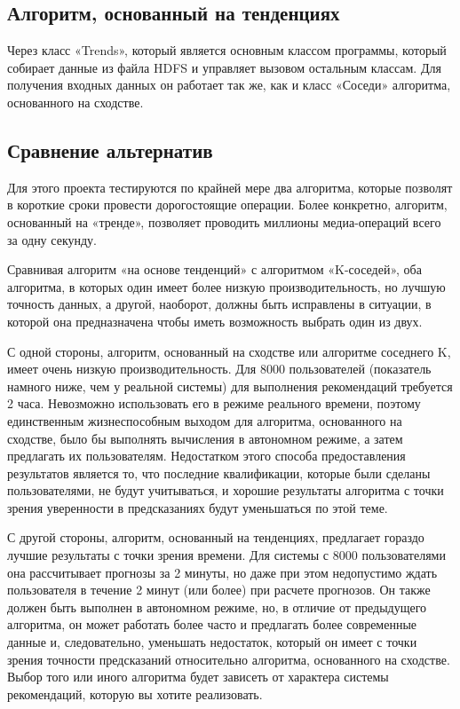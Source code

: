 \subsection{Алгоритм, основанный на тенденциях}

Через класс «Trends», который является основным классом программы, который собирает данные из файла HDFS и управляет вызовом остальным классам. Для получения входных данных он работает так же, как и класс «Соседи» алгоритма, основанного на сходстве.

\subsection{Сравнение альтернатив}

Для этого проекта тестируются по крайней мере два алгоритма, которые позволят в короткие сроки провести дорогостоящие операции. Более конкретно, алгоритм, основанный на «тренде», позволяет проводить миллионы медиа-операций всего за одну секунду.

Сравнивая алгоритм «на основе тенденций» с алгоритмом «K-соседей», оба алгоритма, в которых один имеет более низкую производительность, но лучшую точность данных, а другой, наоборот, должны быть исправлены в ситуации, в которой она предназначена чтобы иметь возможность выбрать один из двух.

С одной стороны, алгоритм, основанный на сходстве или алгоритме соседнего K, имеет очень низкую производительность. Для 8000 пользователей (показатель намного ниже, чем у реальной системы) для выполнения рекомендаций требуется 2 часа. Невозможно использовать его в режиме реального времени, поэтому единственным жизнеспособным выходом для алгоритма, основанного на сходстве, было бы выполнять вычисления в автономном режиме, а затем предлагать их пользователям. Недостатком этого способа предоставления результатов является то, что последние квалификации, которые были сделаны пользователями, не будут учитываться, и хорошие результаты алгоритма с точки зрения уверенности в предсказаниях будут уменьшаться по этой теме.

С другой стороны, алгоритм, основанный на тенденциях, предлагает гораздо лучшие результаты с точки зрения времени. Для системы с 8000 пользователями она рассчитывает прогнозы за 2 минуты, но даже при этом недопустимо ждать пользователя в течение 2 минут (или более) при расчете прогнозов. Он также должен быть выполнен в автономном режиме, но, в отличие от предыдущего алгоритма, он может работать более часто и предлагать более современные данные и, следовательно, уменьшать недостаток, который он имеет с точки зрения точности предсказаний относительно алгоритма, основанного на сходстве.
Выбор того или иного алгоритма будет зависеть от характера системы рекомендаций, которую вы хотите реализовать.

